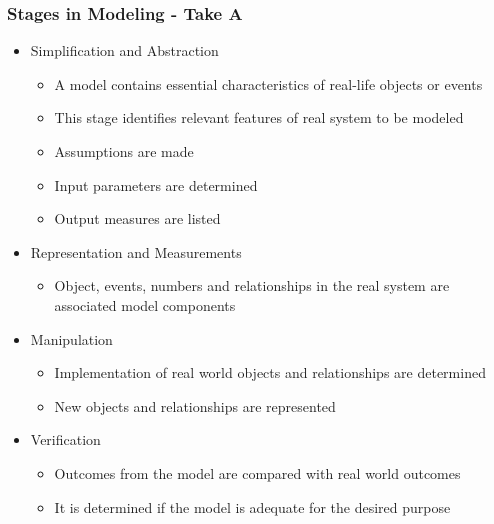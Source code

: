\subsubsection{Stages in Modeling - Take A}
\begin{itemize}
	\item Simplification and Abstraction
	\begin{itemize}
		\item A model contains essential characteristics of
			real-life objects or events
		\item This stage identifies relevant features of real
			system to be modeled
		\item Assumptions are made
		\item Input parameters are determined
		\item Output measures are listed
	\end{itemize}
	\item Representation and Measurements
	\begin{itemize}
		\item Object, events, numbers and relationships in the
			real system are associated model components
	\end{itemize}
	\item Manipulation
	\begin{itemize}
		\item Implementation of real world objects and
			relationships are determined
		\item New objects and relationships are represented
	\end{itemize}
	\item Verification
	\begin{itemize}
		\item Outcomes from the model are compared with real
			world outcomes
		\item It is determined if the model is adequate for the
			desired purpose
	\end{itemize}
\end{itemize}

